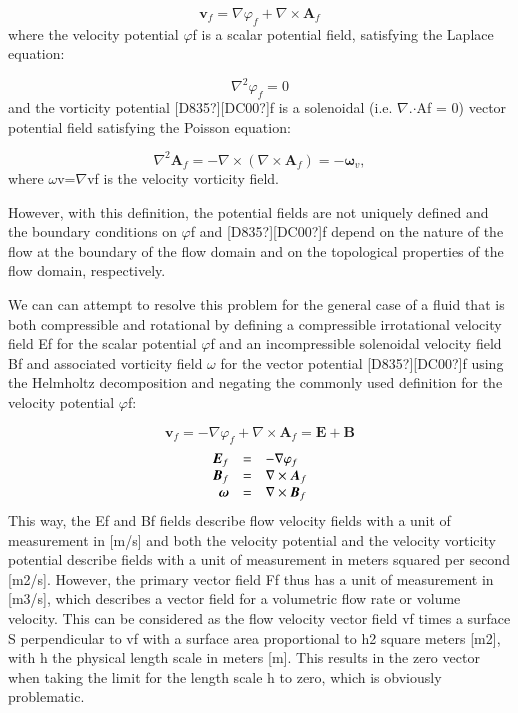 \documentclass[twoside,final]{article}
\begin{document}
{\begin{equation}
\boldsymbol v_f=\nabla \varphi _f+\nabla \times \boldsymbol A_f
\end{equation}
where the velocity potential $\varphi $f is a scalar potential field, satisfying
the Laplace equation:

\begin{equation}
\nabla ^2\varphi _f=0
\end{equation}
and the vorticity potential [D835?][DC00?]f is a solenoidal (i.e.
${\nabla}$.${\cdot}$Af = 0) vector potential field satisfying the Poisson
equation:

\begin{equation}
\nabla ^2\boldsymbol A_f=-\nabla \times (\nabla \times \boldsymbol A_f)=-\boldsymbol{\omega }_v,
\end{equation}
where $\omega $v=${\nabla}${\texttimes}vf  is the velocity vorticity field.

However, with this definition, the potential fields are not uniquely defined and
the boundary conditions on $\varphi $f and [D835?][DC00?]f depend on the nature
of the flow at the boundary of the flow domain and on the topological properties
of the flow domain, respectively.  

We can can attempt to resolve this problem for the general case of a fluid that
is both compressible and rotational by defining a compressible irrotational
velocity field Ef for the scalar potential $\varphi $f and an incompressible
solenoidal velocity field Bf and associated vorticity field $\omega $ for the
vector potential [D835?][DC00?]f using the Helmholtz decomposition and negating
the commonly used definition for the velocity potential $\varphi $f:

\begin{equation}
\boldsymbol v_f=-\nabla \varphi _f+\nabla \times \boldsymbol A_f=\boldsymbol E+\boldsymbol B
\end{equation}
\begin{equation}
\begin{matrix}\hfill \boldsymbol E_f&=&-\nabla \varphi _f\hfill\null \\\hfill \boldsymbol B_f&=&\nabla \times
\boldsymbol A_f\hfill\null \\\hfill \boldsymbol{\omega }&=&\nabla \times \boldsymbol B_f\hfill\null
\end{matrix}
\end{equation}
This way, the Ef and Bf fields describe flow velocity fields with a unit of
measurement in [m/s] and both the velocity potential and the velocity vorticity
potential describe fields with a unit of measurement in meters squared per
second [m2/s]. However, the primary vector field Ff thus has a unit of
measurement in [m3/s], which describes a vector field for a volumetric flow rate
or volume velocity. This can be considered as the flow velocity vector field vf
times a surface S perpendicular to vf with a surface area proportional to h2
square meters [m2], with h the physical length scale in meters [m]. This results
in the zero vector when taking the limit for the length scale h to zero, which
is obviously problematic.

}
\end{document}
